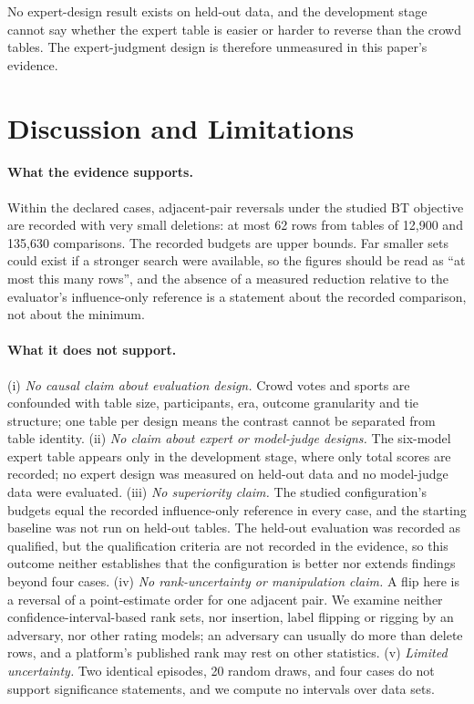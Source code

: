 \documentclass{article}
\begin{document}
No expert-design result exists on held-out data, and the development stage cannot say whether the expert table is easier or harder to reverse than the crowd tables. The expert-judgment design is therefore unmeasured in this paper's evidence.

\section{Discussion and Limitations}
\paragraph{What the evidence supports.} Within the declared cases, adjacent-pair reversals under the studied BT objective are recorded with very small deletions: at most 62 rows from tables of 12,900 and 135,630 comparisons. The recorded budgets are upper bounds. Far smaller sets could exist if a stronger search were available, so the figures should be read as ``at most this many rows'', and the absence of a measured reduction relative to the evaluator's influence-only reference is a statement about the recorded comparison, not about the minimum.

\paragraph{What it does not support.} (i) \emph{No causal claim about evaluation design.} Crowd votes and sports are confounded with table size, participants, era, outcome granularity and tie structure; one table per design means the contrast cannot be separated from table identity. (ii) \emph{No claim about expert or model-judge designs.} The six-model expert table appears only in the development stage, where only total scores are recorded; no expert design was measured on held-out data and no model-judge data were evaluated. (iii) \emph{No superiority claim.} The studied configuration's budgets equal the recorded influence-only reference in every case, and the starting baseline was not run on held-out tables. The held-out evaluation was recorded as qualified, but the qualification criteria are not recorded in the evidence, so this outcome neither establishes that the configuration is better nor extends findings beyond four cases. (iv) \emph{No rank-uncertainty or manipulation claim.} A flip here is a reversal of a point-estimate order for one adjacent pair. We examine neither confidence-interval-based rank sets, nor insertion, label flipping or rigging by an adversary, nor other rating models; an adversary can usually do more than delete rows, and a platform's published rank may rest on other statistics. (v) \emph{Limited uncertainty.} Two identical episodes, 20 random draws, and four cases do not support significance statements, and we compute no intervals over data sets.
\end{document}
